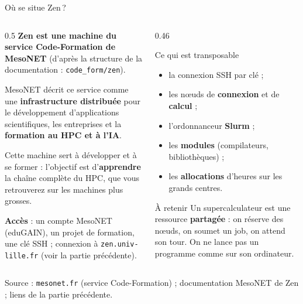 \documentclass[8pt,aspectratio=169]{beamer}
\newcommand{\src}[1]{\vfill{\tiny\color{gray}Source : #1\par}}
\begin{document}
\begin{frame}{Où se situe Zen\,?}
\begin{columns}[T]
\begin{column}{0.5\textwidth}
\textbf{Zen est une machine du service \og Code-Formation \fg{} de MesoNET} (d'après la structure de la documentation : \texttt{code\_form/zen}).

\medskip
MesoNET décrit ce service comme une \textbf{infrastructure distribuée} pour le développement d'applications scientifiques, les entreprises et la \textbf{formation au HPC et à l'IA}.

\medskip
Cette machine sert à développer et à se former : l'objectif est d'\textbf{apprendre} la chaîne complète du HPC, que vous retrouverez sur les machines plus grosses.

\medskip
\textbf{Accès} : un compte MesoNET (eduGAIN), un projet de formation, une clé SSH ; connexion à \texttt{zen.univ-lille.fr} (voir la partie précédente).
\end{column}
\begin{column}{0.46\textwidth}
\begin{block}{Ce qui est transposable}
\begin{itemize}
\item la connexion SSH par clé ;
\item les nœuds de \textbf{connexion} et de \textbf{calcul} ;
\item l'ordonnanceur \textbf{Slurm} ;
\item les \textbf{modules} (compilateurs, bibliothèques) ;
\item les \textbf{allocations} d'heures sur les grands centres.
\end{itemize}
\end{block}
\begin{alertblock}{À retenir}
Un supercalculateur est une ressource \textbf{partagée} : on réserve des nœuds, on soumet un job, on attend son tour. On ne \og lance pas un programme \fg{} comme sur son ordinateur.
\end{alertblock}
\end{column}
\end{columns}
\src{\texttt{mesonet.fr} (service Code-Formation) ; documentation MesoNET de Zen ; liens de la partie précédente.}
\end{frame}
\end{document}
